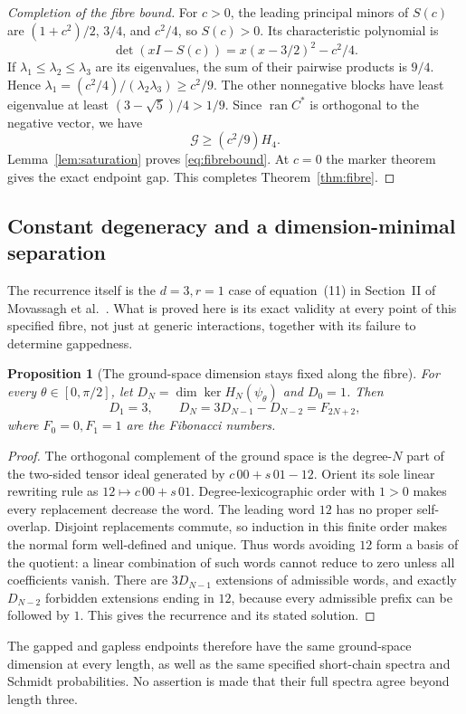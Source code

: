 \documentclass[11pt,a4paper]{article}
\newtheorem{proposition}[theorem]{Proposition}
\theoremstyle{remark}\newtheorem{remark}[theorem]{Remark}
\newcommand{\ran}{\operatorname{ran}}
\begin{document}
\begin{proof}[Completion of the fibre bound]

For $c>0$, the leading principal minors of $S(c)$ are $(1+c^2)/2$, $3/4$, and $c^2/4$, so $S(c)>0$. Its characteristic polynomial is
\begin{equation}\label{eq:Scubic}
 \det(xI-S(c))=x(x-3/2)^2-c^2/4.
\end{equation}
If $\lambda_1\le\lambda_2\le\lambda_3$ are its eigenvalues, the sum of their pairwise products is $9/4$. Hence
$\lambda_1=(c^2/4)/(\lambda_2\lambda_3)\ge c^2/9$.
The other nonnegative blocks have least eigenvalue at least $(3-\sqrt5)/4>1/9$. Since $\ran C^*$ is orthogonal to the negative vector, we have
\[
 \mathcal G\ge(c^2/9)H_4.
\]
Lemma~\ref{lem:saturation} proves \eqref{eq:fibrebound}. At $c=0$ the marker theorem gives the exact endpoint gap. This completes Theorem~\ref{thm:fibre}.
\end{proof}

\subsection{Constant degeneracy and a dimension-minimal separation}
The recurrence itself is the $d=3,r=1$ case of equation~(11) in
Section~II of Movassagh et al.~\cite{Mov}. What is proved here is its
exact validity at every point of this specified fibre, not just at generic
interactions, together with its failure to determine gappedness.
\begin{proposition}[The ground-space dimension stays fixed along the fibre]\label{prop:degeneracy}
For every $\theta\in[0,\pi/2]$, let $D_N=\dim\ker H_N(\psi_\theta)$ and $D_0=1$. Then
\[
 D_1=3,\qquad D_N=3D_{N-1}-D_{N-2}=F_{2N+2},
\]
where $F_0=0,F_1=1$ are the Fibonacci numbers.
\end{proposition}
\begin{proof}
The orthogonal complement of the ground space is the degree-$N$ part of the two-sided tensor ideal generated by $c\,00+s\,01-12$. Orient its sole linear rewriting rule as $12\mapsto c\,00+s\,01$. Degree-lexicographic order with $1>0$ makes every replacement decrease the word. The leading word $12$ has no proper self-overlap. Disjoint replacements commute, so induction in this finite order makes the normal form well-defined and unique. Thus words avoiding $12$ form a basis of the quotient: a linear combination of such words cannot reduce to zero unless all coefficients vanish. There are $3D_{N-1}$ extensions of admissible words, and exactly $D_{N-2}$ forbidden extensions ending in $12$, because every admissible prefix can be followed by $1$. This gives the recurrence and its stated solution.
\end{proof}
The gapped and gapless endpoints therefore have the same ground-space dimension at every length, as well as the same specified short-chain spectra and Schmidt probabilities. No assertion is made that their full spectra agree beyond length three.
\end{document}

